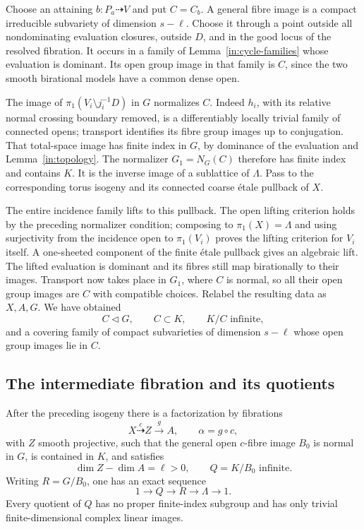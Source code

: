 Choose an attaining $b:P_a\dashrightarrow V$ and put $C=C_b$.
A general fibre image is a compact irreducible subvariety of dimension
$s-\ell$.  Choose it through a point outside all nondominating
evaluation closures, outside $D$, and in the good locus of the
resolved fibration.  It occurs in a family of
Lemma~\ref{in:cycle-families} whose evaluation is dominant.  Its open
group image in that family is $C$, since the two smooth birational
models have a common dense open.

The image of $\pi_1(V_i\setminus j_i^{-1}D)$ in $G$ normalizes $C$.
Indeed $h_i$, with its relative normal crossing boundary removed, is
a differentiably locally trivial family of connected opens; transport
identifies its fibre group images up to conjugation.  That total-space
image has finite index in $G$, by dominance of the evaluation and
Lemma~\ref{in:topology}.  The normalizer $G_1=N_G(C)$ therefore has
finite index and contains $K$.  It is the inverse image of a sublattice
of $\Lambda$.  Pass to the corresponding torus isogeny and its
connected coarse \'etale pullback of $X$.

The entire incidence family lifts to this pullback.  The open lifting
criterion holds by the preceding normalizer condition; composing to
$\pi_1(X)=\Lambda$ and using surjectivity from the incidence open to
$\pi_1(V_i)$ proves the lifting criterion for $V_i$ itself.  A
one-sheeted component of the finite \'etale pullback gives an algebraic
lift.  The lifted evaluation is dominant and its fibres still map
birationally to their images.  Transport now takes place in $G_1$,
where $C$ is normal, so all their open group images are $C$ with
compatible choices.  Relabel the resulting data as $X,A,G$.
We have obtained
\begin{equation}\label{in:normal-C}
 C\triangleleft G,\qquad C\subset K,\qquad K/C\text{ infinite},
\end{equation}
and a covering family of compact subvarieties of dimension $s-\ell$
whose open group images lie in $C$.

\subsection{The intermediate fibration and its quotients}

\begin{proposition}\label{in:intermediate}
After the preceding isogeny there is a factorization by fibrations
\[
 X\overset{c}{\dashrightarrow}Z\overset{g}{\longrightarrow}A,
 \qquad \alpha=g\circ c,
\]
with $Z$ smooth projective, such that the general open $c$-fibre image
$B_0$ is normal in $G$, is contained in $K$, and satisfies
\[
 \dim Z-\dim A=\ell>0,
 \qquad Q=K/B_0\text{ infinite}.
\]
Writing $R=G/B_0$, one has an exact sequence
\begin{equation}\label{in:RQ-sequence}
 1\longrightarrow Q\longrightarrow R\longrightarrow\Lambda
 \longrightarrow1.
\end{equation}
Every quotient of $Q$ has no proper finite-index subgroup and has only
trivial finite-dimensional complex linear images.
\end{proposition}

